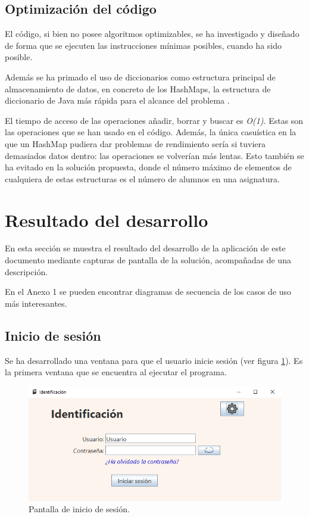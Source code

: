 \subsection{Optimización del código}
\label{sub:optimizarcodigo}
El código, si bien no posee algoritmos optimizables, se ha investigado y diseñado de forma que se ejecuten las instrucciones mínimas posibles, cuando ha sido posible.

Además se ha primado el uso de diccionarios como estructura principal de almacenamiento de datos, en concreto de los HashMaps, la estructura de diccionario de Java más rápida para el alcance del problema \cite{hashmap}.

El tiempo de acceso de las operaciones añadir, borrar y buscar es \textit{O(1)}. Estas son las operaciones que se han usado en el código. Además, la única casuística en la que un HashMap pudiera dar problemas de rendimiento sería si tuviera demasiados datos dentro: las operaciones se volverían más lentas. Esto también se ha evitado en la solución propuesta, donde el número máximo de elementos de cualquiera de estas estructuras es el número de alumnos en una asignatura.

\section{Resultado del desarrollo}
En esta sección se muestra el resultado del desarrollo de la aplicación de este documento mediante capturas de pantalla de la solución, acompañadas de una descripción.

En el Anexo 1 se pueden encontrar diagramas de secuencia de los casos de uso más interesantes.

\subsection{Inicio de sesión}
Se ha desarrollado una ventana para que el usuario inicie sesión (ver figura \ref{Fig:login}). Es la primera ventana que se encuentra al ejecutar el programa.

\begin{figure}[h]
\centering\includegraphics[width=1\linewidth]{figs/login.png}
\caption{Pantalla de inicio de sesión.}
\label{Fig:login}
\end{figure}

